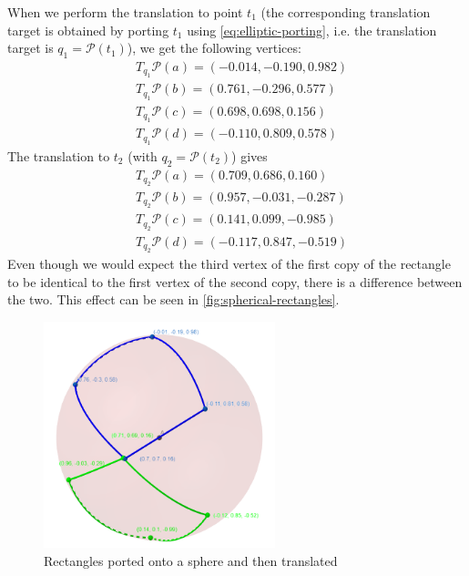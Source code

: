 When we perform the translation to point $t_1$ (the corresponding translation target is obtained by porting $t_1$ using \autoref{eq:elliptic-porting}, i.e. the translation target is $q_1 = \mathcal{P}(t_1)$), we get the following vertices:
\begin{equation*}
    \begin{split}
         & T_{q_1}\mathcal{P}(a) =  (-0.014, -0.190, 0.982) \\
         & T_{q_1}\mathcal{P}(b) = (0.761, -0.296, 0.577)   \\
         & T_{q_1}\mathcal{P}(c) = (0.698, 0.698, 0.156)    \\
         & T_{q_1}\mathcal{P}(d) = (-0.110, 0.809, 0.578)
    \end{split}
\end{equation*}
The translation to $t_2$ (with $q_2 = \mathcal{P}(t_2)$) gives
\begin{equation*}
    \begin{split}
         & T_{q_2}\mathcal{P}(a) = (0.709, 0.686, 0.160)   \\
         & T_{q_2}\mathcal{P}(b) = (0.957, -0.031, -0.287) \\
         & T_{q_2}\mathcal{P}(c) = (0.141, 0.099, -0.985)  \\
         & T_{q_2}\mathcal{P}(d) = (-0.117, 0.847, -0.519)
    \end{split}
\end{equation*}
Even though we would expect the third vertex of the first copy of the rectangle to be identical to the first vertex of the second copy, there is a difference between the two.
This effect can be seen in \autoref{fig:spherical-rectangles}.
\begin{figure}[h]
    \centering
    \includegraphics[width=0.6\textwidth]{chapters/theoretical_foundations/sections/non-eudlidean-spaces/resources/spherical-rectangles.png}
    \caption{Rectangles ported onto a sphere and then translated}
    \label{fig:spherical-rectangles}
\end{figure}
